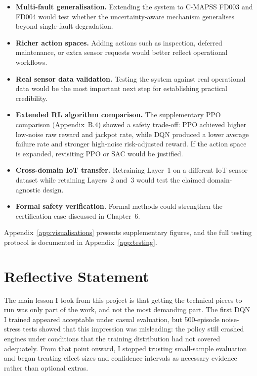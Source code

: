\documentclass[12pt,a4paper]{report}
\begin{document}
\begin{itemize}
    \item \textbf{Multi-fault generalisation.} Extending the system to C-MAPSS FD003 and FD004 would test whether the uncertainty-aware mechanism generalises beyond single-fault degradation.
    \item \textbf{Richer action spaces.} Adding actions such as inspection, deferred maintenance, or extra sensor requests would better reflect operational workflows.
    \item \textbf{Real sensor data validation.} Testing the system against real operational data would be the most important next step for establishing practical credibility.
    \item \textbf{Extended RL algorithm comparison.} The supplementary PPO comparison (Appendix~B.4) showed a safety trade-off: PPO achieved higher low-noise raw reward and jackpot rate, while DQN produced a lower average failure rate and stronger high-noise risk-adjusted reward. If the action space is expanded, revisiting PPO \citep{schulman2017proximal} or SAC \citep{haarnoja2018soft} would be justified.
    \item \textbf{Cross-domain IoT transfer.} Retraining Layer~1 on a different IoT sensor dataset while retaining Layers~2 and~3 would test the claimed domain-agnostic design.
    \item \textbf{Formal safety verification.} Formal methods could strengthen the certification case discussed in Chapter~6.
\end{itemize}

Appendix~\ref{app:visualisations} presents supplementary figures, and the full testing protocol is documented in Appendix~\ref{app:testing}.

\section{Reflective Statement}

The main lesson I took from this project is that getting the technical pieces to run was only part of the work, and not the most demanding part. The first DQN I trained appeared acceptable under casual evaluation, but 500-episode noise-stress tests showed that this impression was misleading: the policy still crashed engines under conditions that the training distribution had not covered adequately. From that point onward, I stopped trusting small-sample evaluation and began treating effect sizes and confidence intervals as necessary evidence rather than optional extras.
\end{document}
